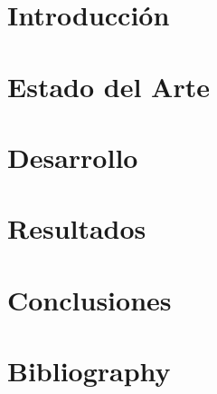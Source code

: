 \documentclass[11pt]{report} %
\begin{document}
\tableofcontents
\newpage

\onehalfspacing%

\chapter{Introducción} %

\chapter{Estado del Arte} %

\chapter{Desarrollo} %

\chapter{Resultados} %

\chapter{Conclusiones} %

\chapter{Bibliography} %
\end{document}
